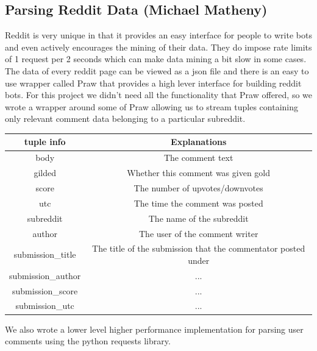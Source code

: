 \documentclass[12pt]{article}
\numberwithin{equation}{section}
\begin{document}
		
\subsection*{Parsing Reddit Data (Michael Matheny)}
Reddit is very unique in that it provides an easy interface for people to write bots and even actively encourages
the mining of their data. They do impose rate limits of 1 request per 2 seconds which can make data mining a bit slow
in some cases. The data of every reddit page can be viewed as a json file and there is an easy to use wrapper called Praw
that provides a high lever interface for building reddit bots. 
For this project we didn't need all the functionality that Praw offered, so we wrote a wrapper around some of Praw
allowing us to stream tuples containing only relevant comment data belonging to a particular subreddit. 

\begin{tabular}{|c|c|}
	\hline tuple info & Explanations \\
	\hline body &    The comment text \\ 
	\hline gilded &  Whether this comment was given gold \\ 
	\hline score &   The number of upvotes/downvotes \\ 
	\hline utc &     The time the comment was posted \\ 
	\hline subreddit &  The name of the subreddit \\ 
	\hline author &  The user of the comment writer\\ 
	\hline submission\_title &  The title of the submission that the commentator posted under  \\ 
	\hline submission\_author &  ... \\ 
	\hline submission\_score &  ...\\ 
	\hline submission\_utc &  ...\\ 
	\hline 
\end{tabular} 

We also wrote a lower level higher performance implementation for parsing user comments using the python requests 
library. 
		
		
\end{document}
